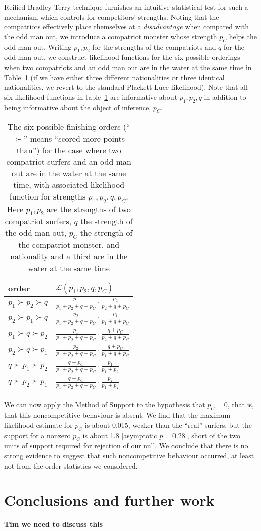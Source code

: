 \documentclass{article}
\begin{document}
Reified Bradley-Terry technique furnishes an intuitive statistical
test for such a mechanism which controls for competitors' strengths.
Noting that the compatriots effectively place themselves at a {\em
  disadvantage} when compared with the odd man out, we introduce a
compatriot monster whose strength $p_C$ helps the odd man out.
Writing $p_1, p_2$ for the strengths of the compatriots and $q$ for
the odd man out, we construct likelihood functions for the six
possible orderings when two compatriots and an odd man out are in the
water at the same time in Table~\ref{likelihoodcompatriot} (if we have
either three different nationalities or three identical nationalities,
we revert to the standard Plackett-Luce likelihood).  Note that all
six likelihood functions in table~\ref{likelihoodcompatriot} are
informative about $p_1,p_2,q$ in addition to being informative about
the object of inference, $p_C$.

\begin{table}
\begin{tabular}{l|l}
order  & ${\mathcal L}(p_1,p_2,q,p_C)$\\ \hline
$p_1\succ p_2\succ q $ & $ \frac{p_1}{p_1+p_2+q+p_C}\cdot\frac{p_2}{p_2+q+p_C}$\\
$p_2\succ p_1\succ q $ & $ \frac{p_2}{p_1+p_2+q+p_C}\cdot\frac{p_1}{p_1+q+p_C}$\\
$p_1\succ q\succ p_2 $ & $ \frac{p_1}{p_1+p_2+q+p_C}\cdot\frac{q+p_C}{p_2+q+p_C}$\\
$p_2\succ q\succ p_1 $ & $ \frac{p_2}{p_1+p_2+q+p_C}\cdot\frac{q+p_C}{p_1+q+p_C}$\\
$q\succ p_1\succ p_2 $ & $ \frac{q+p_C}{p_1+p_2+q+p_C}\cdot\frac{p_1}{p_1+p_2}$\\
$q\succ p_2\succ p_1 $ & $ \frac{q+p_C}{p_1+p_2+q+p_C}\cdot\frac{p_2}{p_1+p_2}$\\
\end{tabular}
\caption{The \label{likelihoodcompatriot} six possible finishing
  orders (``$\succ$'' means ``scored more points than'') for the case
  where two compatriot surfers and an odd man out are in the water at
  the same time, with associated likelihood function for strengths
  $p_1,p_2,q, p_C$.  Here $p_1,p_2$ are the strengths of two
  compatriot surfers, $q$ the strength of the odd man out, $p_C$ the
  strength of the compatriot monster. and nationality and a third are
  in the water at the same time}
\end{table}

We can now apply the Method of Support to the hypothesis that $p_C=0$,
that is, that this noncompetitive behaviour is absent.  We find that
the maximum likelihood estimate for $p_C$ is about 0.015, weaker than
the ``real'' surfers, but the support for a nonzero $p_C$ is about 1.8
[asymptotic $p=0.28$], short of the two units of support required for
rejection of our null.  We conclude that there is no strong evidence
to suggest that such noncompetitive behaviour occurred, at least not
from the order statistics we considered.

\section{Conclusions and further work}

{\bf\large Tim we need to discuss this}


\end{document}
